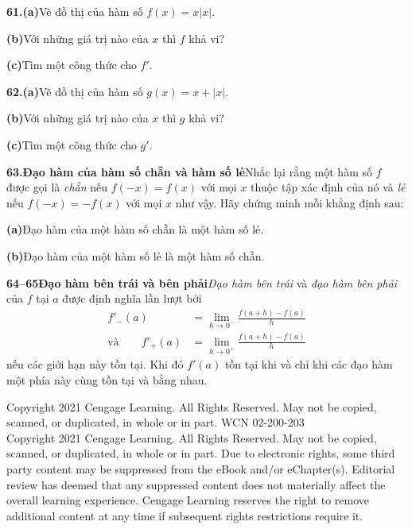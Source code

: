 \documentclass[10pt]{article}
\begin{document}
\begin{minipage}[t]{0.485\textwidth}
\textbf{\color{stewartred}61.}\enspace \textbf{(a)}\enspace Vẽ đồ thị của hàm số $f(x) = x|x|$.\par
\hspace*{1.6em}\textbf{(b)}\enspace Với những giá trị nào của $x$ thì $f$ khả vi?\par
\hspace*{1.6em}\textbf{(c)}\enspace Tìm một công thức cho $f'$.

\textbf{\color{stewartred}62.}\enspace \textbf{(a)}\enspace Vẽ đồ thị của hàm số $g(x) = x + |x|$.\par
\hspace*{1.6em}\textbf{(b)}\enspace Với những giá trị nào của $x$ thì $g$ khả vi?\par
\hspace*{1.6em}\textbf{(c)}\enspace Tìm một công thức cho $g'$.

\textbf{\color{stewartred}63.}\enspace \textbf{Đạo hàm của hàm số chẵn và hàm số lẻ}\enspace Nhắc lại rằng một hàm số $f$ được gọi là \textit{chẵn} nếu $f(-x) = f(x)$ với mọi $x$ thuộc tập xác định của nó và \textit{lẻ} nếu $f(-x) = -f(x)$ với mọi $x$ như vậy. Hãy chứng minh mỗi khẳng định sau:\par
\hspace*{1.6em}\textbf{(a)}\enspace Đạo hàm của một hàm số chẵn là một hàm số lẻ.\par
\hspace*{1.6em}\textbf{(b)}\enspace Đạo hàm của một hàm số lẻ là một hàm số chẵn.

\vspace{1pt}
\textbf{\color{stewartcyan}64--65\quad Đạo hàm bên trái và bên phải}\enspace \textit{Đạo hàm bên trái} và \textit{đạo hàm bên phải} của $f$ tại $a$ được định nghĩa lần lượt bởi
\begin{align*}
f'_-(a) &= \lim_{h \to 0^-} \frac{f(a+h) - f(a)}{h} \\[2pt]
\text{và}\qquad f'_+(a) &= \lim_{h \to 0^+} \frac{f(a+h) - f(a)}{h}
\end{align*}
nếu các giới hạn này tồn tại. Khi đó $f'(a)$ tồn tại khi và chỉ khi các đạo hàm một phía này cùng tồn tại và bằng nhau.

\end{minipage}

\vfill
{\centering 
  \fontsize{6.5pt}{7.5pt}\selectfont\color{black!55}
  Copyright 2021 Cengage Learning. All Rights Reserved. May not be copied, scanned, or duplicated, in whole or in part. WCN 02-200-203\\ 
  Copyright 2021 Cengage Learning. All Rights Reserved. May not be copied, scanned, or duplicated, in whole or in part. Due to electronic rights, some third party content may be suppressed from the eBook and/or eChapter(s). Editorial review has deemed that any suppressed content does not materially affect the overall learning experience. Cengage Learning reserves the right to remove additional content at any time if subsequent rights restrictions require it.
\par}
\end{document}
